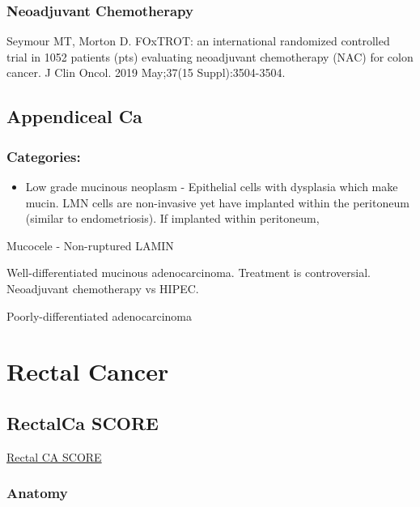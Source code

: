 \documentclass[
]{book}
\providecommand{\tightlist}{%
  \setlength{\itemsep}{0pt}\setlength{\parskip}{0pt}}
\begin{document}
\hypertarget{neoadjuvant-chemotherapy}{%
\section{Neoadjuvant Chemotherapy}\label{neoadjuvant-chemotherapy}}

Seymour MT, Morton D. FOxTROT: an international randomized controlled trial in 1052 patients (pts) evaluating neoadjuvant chemotherapy (NAC) for colon cancer. J Clin Oncol. 2019 May;37(15 Suppl):3504-3504.

\hypertarget{appendiceal-ca}{%
\chapter{Appendiceal Ca}\label{appendiceal-ca}}

\hypertarget{categories}{%
\section{Categories:}\label{categories}}

\begin{itemize}
\tightlist
\item
  Low grade mucinous neoplasm - Epithelial cells with dysplasia which make mucin. LMN cells are non-invasive yet have implanted within the peritoneum (similar to endometriosis). If implanted within peritoneum,
\end{itemize}

Mucocele - Non-ruptured LAMIN

Well-differentiated mucinous adenocarcinoma. Treatment is controversial. Neoadjuvant chemotherapy vs HIPEC.

Poorly-differentiated adenocarcinoma

\hypertarget{part-rectal-cancer}{%
\part*{Rectal Cancer}\label{part-rectal-cancer}}

\hypertarget{rectalca-score}{%
\chapter{RectalCa SCORE}\label{rectalca-score}}

\href{https://www.surgicalcore.org/modulecontent.aspx?id=130244}{Rectal CA SCORE}

\hypertarget{anatomy}{%
\section{Anatomy}\label{anatomy}}
\end{document}
